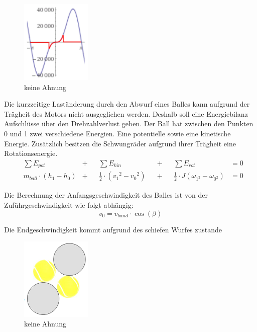 \begin{figure}[h!]
	\centering
	\includegraphics[width=0.3\textwidth]{Enddokumentation/Anhang/Bilder/WeissNicht.png}
	\caption{keine Ahnung}
	\label{fig:keineAhnung}
\end{figure}

Die kurzzeitige Laständerung durch den Abwurf eines Balles kann aufgrund der Trägheit des Motors nicht ausgeglichen werden. Deshalb soll eine Energiebilanz Aufschlüsse über den Drehzahlverlust geben. Der Ball hat zwischen den Punkten 0 und 1 zwei verschiedene Energien. Eine potentielle sowie eine kinetische Energie. Zusätzlich besitzen die Schwungräder aufgrund ihrer Trägheit eine Rotationsenergie.
\begin{align}
    &\sum E_{pot} &+&& \sum E_{kin} &&+&& \sum E_{rot} &= 0 \\
    & m_{ball} \cdot \left(h_1 - h_0\right) &+&&\frac{1}{2} \cdot \left( v_1{^{2}} - v_0{^{2}} \right) &&+&&\frac{1}{2} \cdot J \left( \omega_{1^{2}} - \omega_{0^{2}} \right) &= 0
\end{align}

Die Berechnung der Anfangsgeschwindigkeit des Balles ist von der Zuführgeschwindigkeit wie folgt abhängig:
\begin{equation}
    v_0 = v_{band} \cdot \cos(\beta)
\end{equation}

Die Endgeschwindigkeit kommt aufgrund des schiefen Wurfes zustande
\begin{figure}[h!]
	\centering
	\includegraphics[width=0.3\textwidth]{Enddokumentation/Anhang/Bilder/Ballnachfuehrung.png}
	\caption{keine Ahnung}
	\label{fig:Ballnachführung}
\end{figure}

